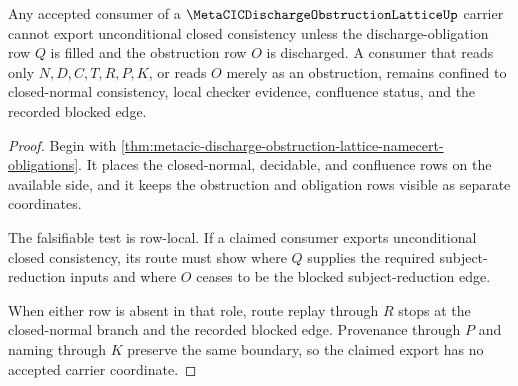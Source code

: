 \begin{theorem}
\label{thm:metacic-discharge-obstruction-lattice-falsifiable-nonescape}
Any accepted consumer of a $\MetaCICDischargeObstructionLatticeUp$ carrier cannot export unconditional closed consistency unless the discharge-obligation row $Q$ is filled and the obstruction row $O$ is discharged. A consumer that reads only $N,D,C,T,R,P,K$, or reads $O$ merely as an obstruction, remains confined to closed-normal consistency, local checker evidence, confluence status, and the recorded blocked edge.
\end{theorem}
\begin{proof}
Begin with \autoref{thm:metacic-discharge-obstruction-lattice-namecert-obligations}. It places the closed-normal, decidable, and confluence rows on the available side, and it keeps the obstruction and obligation rows visible as separate coordinates.

The falsifiable test is row-local. If a claimed consumer exports unconditional closed consistency, its route must show where $Q$ supplies the required subject-reduction inputs and where $O$ ceases to be the blocked subject-reduction edge.

When either row is absent in that role, route replay through $R$ stops at the closed-normal branch and the recorded blocked edge. Provenance through $P$ and naming through $K$ preserve the same boundary, so the claimed export has no accepted carrier coordinate.
\end{proof}

